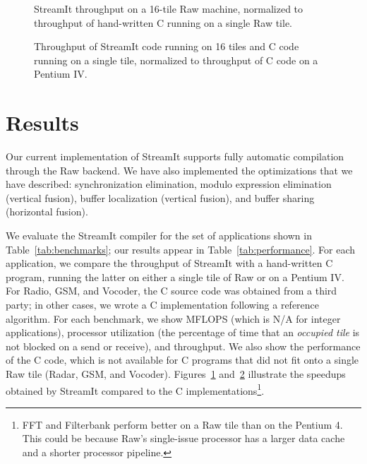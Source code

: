 \begin{figure}
\centering
\vspace{6pt}
\vspace{-6pt}
\caption{\protect\small StreamIt throughput on a 16-tile Raw machine,
normalized to throughput of hand-written C running on a single Raw
tile.  \protect\label{fig:compare-raw}}
\vspace{-12pt}
\end{figure}

\begin{figure}
\centering
{}
\vspace{-6pt}
\caption{Throughput of StreamIt code running on 16 tiles and C code
running on a single tile, normalized to throughput of C code on a
Pentium IV. \protect\label{fig:compare-pentium}}
\vspace{-12pt}
\end{figure}

\section{Results}
\label{sec:results}

Our current implementation of StreamIt supports fully automatic
compilation through the Raw backend.  We have also implemented the
optimizations that we have described: synchronization elimination,
modulo expression elimination (vertical fusion), buffer localization
(vertical fusion), and buffer sharing (horizontal fusion).

We evaluate the StreamIt compiler for the set of applications shown in
Table~\ref{tab:benchmarks}; our results appear in
Table~\ref{tab:performance}.
For each application, we compare the throughput of StreamIt with a
hand-written C program, running the latter on either a single tile of
Raw or on a Pentium IV.  For Radio, GSM, and Vocoder, the C source
code was obtained from a third party; in other cases, we wrote a C
implementation following a reference algorithm.  For each benchmark,
we show MFLOPS (which is N/A for integer applications), processor
utilization (the percentage of time that an {\it occupied tile} is not
blocked on a send or receive), and throughput.  We also show the
performance of the C code, which is not available for C programs that
did not fit onto a single Raw tile (Radar, GSM, and Vocoder).
Figures~\ref{fig:compare-raw} and~\ref{fig:compare-pentium} illustrate
the speedups obtained by StreamIt compared to the C
implementations\footnote{FFT and Filterbank perform better on a Raw
tile than on the Pentium 4.  This could be because Raw's single-issue
processor has a larger data cache and a shorter processor pipeline.}.

